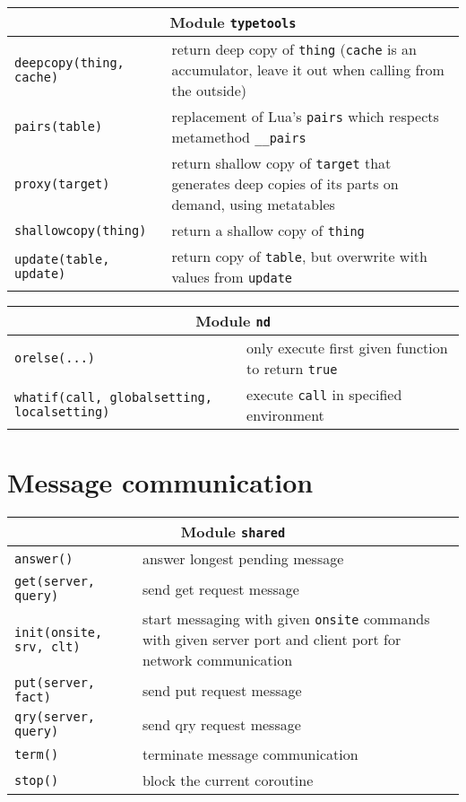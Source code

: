 \begin{appendices}
\begin{table}[H]
\begin{tabular}{|p{5cm}|p{8cm}|}
\hline
\multicolumn{2}{|c|}{Module \texttt{typetools}}\\
\hline
\hline
\texttt{deepcopy(thing, cache)} & return deep copy of \texttt{thing} (\texttt{cache} is an accumulator, leave it out when calling from the outside)\\
\hline
\texttt{pairs(table)} & replacement of Lua's \texttt{pairs} which respects metamethod \texttt{\_\_pairs}\\
\hline
\texttt{proxy(target)} & return shallow copy of \texttt{target} that generates deep copies of its parts on demand, using metatables\\
\hline
\texttt{shallowcopy(thing)} & return a shallow copy of \texttt{thing}\\
\hline
\texttt{update(table, update)} & return copy of \texttt{table}, but overwrite with values from \texttt{update}\\
\hline
\end{tabular}
\end{table}

\begin{table}[H]
\begin{tabular}{|p{5cm}|p{8cm}|}
\hline
\multicolumn{2}{|c|}{Module \texttt{nd}}\\
\hline
\hline
\texttt{orelse(...)} & only execute first given function to return \texttt{true}\\
\hline
\texttt{whatif(call, globalsetting, localsetting)} & execute \texttt{call} in specified environment\\
\hline
\end{tabular}
\end{table}


\section{Message communication}

\begin{table}[H]
\begin{tabular}{|p{5cm}|p{8cm}|}
\hline
\multicolumn{2}{|c|}{Module \texttt{shared}}\\
\hline
\hline
\texttt{answer()} & answer longest pending message \\
\hline
\texttt{get(server, query)} & send get request message \\
\hline
\texttt{init(onsite, srv, clt)} & start messaging with given \texttt{onsite} commands with given server port and client port for network communication\\
\hline
\texttt{put(server, fact)} & send put request message \\
\hline
\texttt{qry(server, query)} & send qry request message \\
\hline
\texttt{term()} & terminate message communication \\
\hline
\texttt{stop()} & block the current coroutine \\
\hline
\end{tabular}
\end{table}


\end{appendices}
